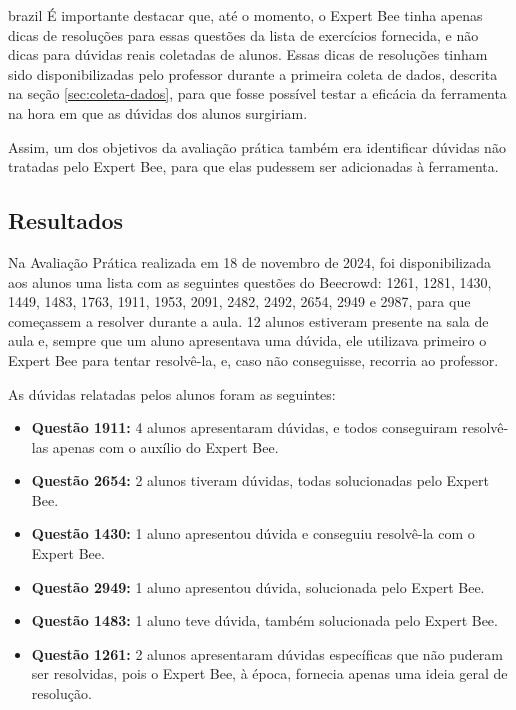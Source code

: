 \begin{otherlanguage*}{brazil}
É importante destacar que, até o momento, o Expert Bee tinha apenas dicas de resoluções para essas questões da lista de exercícios fornecida, e não dicas para dúvidas reais coletadas de alunos. Essas dicas de resoluções tinham sido disponibilizadas pelo professor durante a primeira coleta de dados, descrita na seção \ref{sec:coleta-dados}, para que fosse possível testar a eficácia da ferramenta na hora em que as dúvidas dos alunos surgiriam. 

Assim, um dos objetivos da avaliação prática também era identificar dúvidas não tratadas pelo Expert Bee, para que elas pudessem ser adicionadas à ferramenta.

\subsection{Resultados}  

Na Avaliação Prática realizada em 18 de novembro de 2024, foi disponibilizada aos alunos uma lista com as seguintes questões do Beecrowd: 1261, 1281, 1430, 1449, 1483, 1763, 1911, 1953, 2091, 2482, 2492, 2654, 2949 e 2987, para que começassem a resolver durante a aula. 12 alunos estiveram presente na sala de aula e, sempre que um aluno apresentava uma dúvida, ele utilizava primeiro o Expert Bee para tentar resolvê-la, e, caso não conseguisse, recorria ao professor. 

As dúvidas relatadas pelos alunos foram as seguintes:  

\begin{itemize}  
    \item \textbf{Questão 1911:} 4 alunos apresentaram dúvidas, e todos conseguiram resolvê-las apenas com o auxílio do Expert Bee.  
    \item \textbf{Questão 2654:} 2 alunos tiveram dúvidas, todas solucionadas pelo Expert Bee.  
    \item \textbf{Questão 1430:} 1 aluno apresentou dúvida e conseguiu resolvê-la com o Expert Bee.  
    \item \textbf{Questão 2949:} 1 aluno apresentou dúvida, solucionada pelo Expert Bee.  
    \item \textbf{Questão 1483:} 1 aluno teve dúvida, também solucionada pelo Expert Bee.  
    \item \textbf{Questão 1261:} 2 alunos apresentaram dúvidas específicas que não puderam ser resolvidas, pois o Expert Bee, à época, fornecia apenas uma ideia geral de resolução.  
\end{itemize}  


\end{otherlanguage*}

